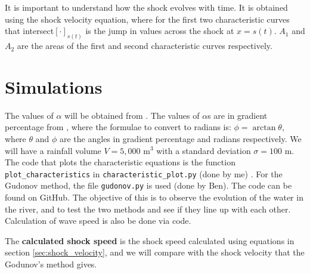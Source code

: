 \documentclass[12pt]{article}
\begin{document}
It is important to understand how the shock evolves with time. It is obtained using the shock velocity equation, where  for the first two characteristic curves that intersect$[\cdot]_{s(t)}$ is the jump in values across the shock at $x = s(t)$. $A_1$ and $A_2$ are the areas of the first and second characteristic curves respectively.

\section{Simulations}
\label{sec:results}
The values of $\alpha$ will be obtained from \cite{ROSGEN1994169}. The values of $\alpha$s are in gradient percentage from \cite{ROSGEN1994169}, where the formulae to convert to radians is: $\phi = \arctan{\theta}$, where $\theta$ and $\phi$ are the angles in gradient percentage and radians respectively. We will have a rainfall volume $V = 5,000\text{ m}^3$ with a standard deviation $\sigma = 100\text{ m}$. The code that plots the characteristic equations is the function \verb|plot_characteristics| in \verb|characteristic_plot.py| (done by me) . For the Gudonov method, the file \verb|gudonov.py| is used (done by Ben). The code can be found on GitHub\cite{linsuong_2023}. The objective of this is to observe the evolution of the water in the river, and to test the two methods and see if they line up with each other. Calculation of wave speed is also be done via code.

The \textbf{calculated shock speed} is the shock speed calculated using equations in section \ref{sec:shock_velocity}, and we will compare with the shock velocity that the Godunov's method gives.
\end{document}
